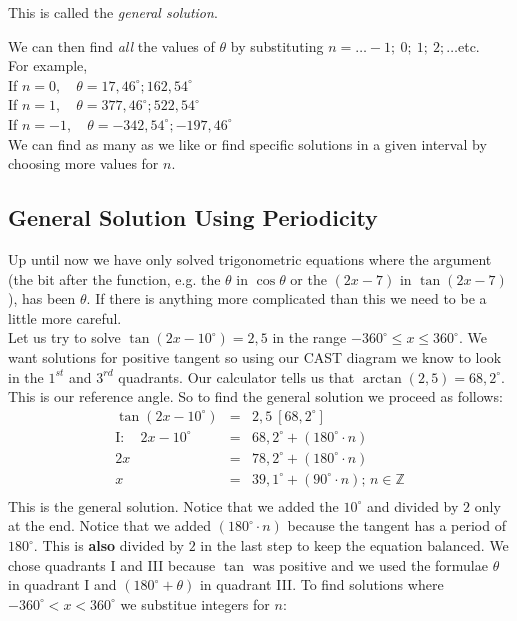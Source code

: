 \begin{wex}{}
{This is called the \emph{general solution}.

We can then find \emph{all} the values of $\theta$ by substituting $n=\ldots-1;~0;~1;~2;\ldots$etc.\\
For example,\\
If $n = 0,\quad \theta = 17,46^{\circ}; 162,54^{\circ}$ \\
If $n = 1,\quad \theta = 377,46^{\circ}; 522,54^{\circ}$ \\
If $n = -1,\quad \theta = -342,54^{\circ}; -197,46^{\circ}$ \\ 
We can find as many as we like or find specific solutions in a given interval by choosing more values for $n$.
}
\end{wex}

\subsection{General Solution Using Periodicity}
Up until now we have only solved trigonometric equations where the argument (the bit after the function, e.g. the $\theta$ in $\cos\theta$ or the $(2x-7)$ in $\tan(2x-7)$), has been $\theta$. If there is anything more complicated than this we need to be a little more careful. \\
Let us try to solve $\tan(2x-10^\circ)=2,5$ in the range $-360^\circ \leq x \leq 360^\circ$. We want solutions for positive tangent so using our CAST diagram we know to look in the $1^{st}$ and $3^{rd}$ quadrants. Our calculator tells us that $\arctan(2,5)=68,2^\circ$. This is our reference angle. So to find the general solution we proceed as follows:
 \begin{eqnarray*}
 \tan(2x-10^{\circ}) &=& 2,5\ [68,2^{\circ}]\\
 \mathrm{I:} \quad 2x-10^{\circ}&=&68,2^{\circ}+(180^{\circ}\cdot n)\\ 2x&=&78,2^{\circ}+(180^{\circ}\cdot n)\\
 x&=&39,1^{\circ}+(90^{\circ}\cdot n)\mbox{; }n \in \mathbb{Z} \\
\end{eqnarray*}
This is the general solution. Notice that we added the $10^{\circ}$ and divided by $2$ only at the end. Notice that we added $(180^{\circ}\cdot n)$ because the tangent has a period of $180^{\circ}$. This is \textbf{also} divided by $2$ in the last step to keep the equation balanced. We chose quadrants I and III because $\tan$ was positive and we used the formulae $\theta$ in quadrant I and $(180^{\circ}+\theta)$ in quadrant III. To find solutions where $-360^{\circ}<x<360^{\circ}$ we substitue integers for $n$:
